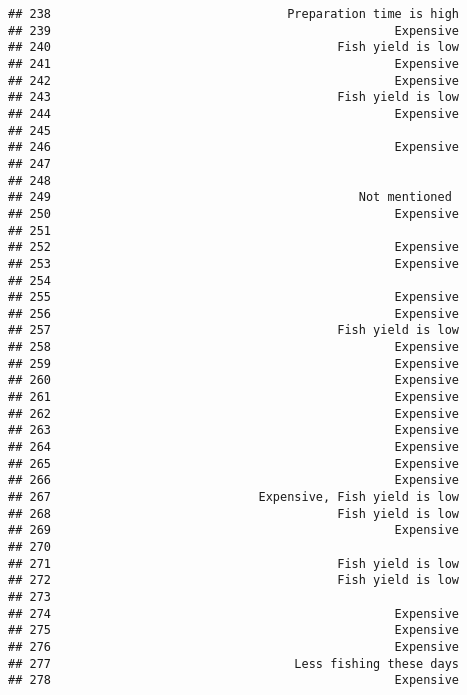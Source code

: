 \documentclass[
]{article}
\begin{document}
\begin{verbatim}
## 238                                 Preparation time is high
## 239                                                Expensive
## 240                                        Fish yield is low
## 241                                                Expensive
## 242                                                Expensive
## 243                                        Fish yield is low
## 244                                                Expensive
## 245                                                         
## 246                                                Expensive
## 247                                                         
## 248                                                         
## 249                                           Not mentioned 
## 250                                                Expensive
## 251                                                         
## 252                                                Expensive
## 253                                                Expensive
## 254                                                         
## 255                                                Expensive
## 256                                                Expensive
## 257                                        Fish yield is low
## 258                                                Expensive
## 259                                                Expensive
## 260                                                Expensive
## 261                                                Expensive
## 262                                                Expensive
## 263                                                Expensive
## 264                                                Expensive
## 265                                                Expensive
## 266                                                Expensive
## 267                             Expensive, Fish yield is low
## 268                                        Fish yield is low
## 269                                                Expensive
## 270                                                         
## 271                                        Fish yield is low
## 272                                        Fish yield is low
## 273                                                         
## 274                                                Expensive
## 275                                                Expensive
## 276                                                Expensive
## 277                                  Less fishing these days
## 278                                                Expensive

\end{verbatim}
\end{document}
